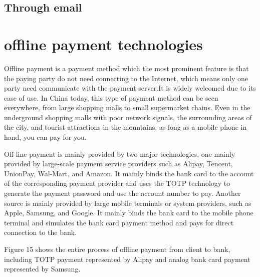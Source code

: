 \documentclass[journal]{IEEEtran}
\begin{document}
\subsection{Through email}

\section{offline payment technologies}
Offline payment is a payment method which the most prominent feature is that the paying party do not need connecting to the Internet, which means only one party need communicate with the payment server.It is widely welcomed due to its ease of use. In China today, this type of payment method can be seen everywhere, from large shopping malls to small supermarket chains. Even in the underground shopping malls with poor network signals, the surrounding areas of the city, and tourist attractions in the mountains, as long as a mobile phone in hand, you can pay for you. 

Off-line payment is mainly provided by two major technologies, one mainly provided  by large-scale payment service providers such as Alipay, Tencent, UnionPay, Wal-Mart, and Amazon. It mainly binds the bank card to the account of the corresponding payment provider and uses the TOTP technology to generate the payment password and use the account number to pay. Another source is mainly provided by large mobile terminals or system providers, such as Apple, Samsung, and Google. It mainly binds the bank card to the mobile phone terminal and simulates the bank card payment method and pays for direct connection to the bank.

Figure 15 shows the entire process of offline payment from client to bank, including TOTP payment represented by Alipay and analog bank card payment represented by Samsung.
\end{document}
